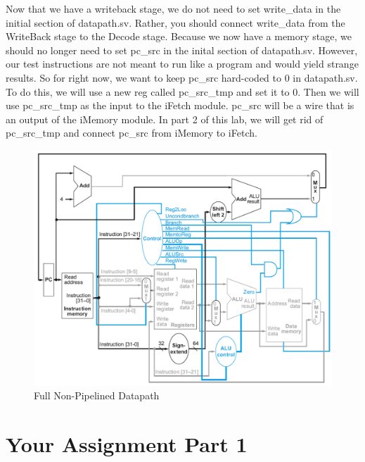 Now that we have a writeback stage, we do not need to set write\_data in the initial section of datapath.sv.  Rather, you should connect write\_data from the WriteBack stage to the Decode stage.  Because we now have a memory stage, we should no longer need to set pc\_src in the inital section of datapath.sv.  However, our test instructions are not meant to run like a program and would yield strange results.  So for right now, we want to keep pc\_src hard-coded to 0 in datapath.sv.  To do this, we will use a new reg called pc\_src\_tmp and set it to 0.  Then we will use pc\_src\_tmp as the input to the iFetch module.  pc\_src will be a wire that is an output of the iMemory module.  In part 2 of this lab, we will get rid of pc\_src\_tmp and connect pc\_src from iMemory to iFetch.

\begin{figure}
\caption{Full Non-Pipelined Datapath}\label{fig:datapath}
\begin{center}
\includegraphics[width=\textwidth]{../images/non_pipelined_datapath.png}
\end{center}
\end{figure}

\section{Your Assignment Part 1}

